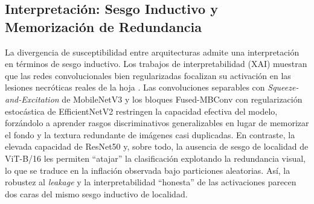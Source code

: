 \documentclass[journal,compsoc]{IEEEtran}
\begin{document}
\begin{table}[H]
\centering
\caption{Exactitud Reportada (particiones aleatorias) vs.\ Evaluación Anti-Fuga de Este Trabajo}
\label{tab:sota}
\end{table}

\subsection{Interpretación: Sesgo Inductivo y Memorización de Redundancia}
La divergencia de susceptibilidad entre arquitecturas admite una interpretación en términos de sesgo inductivo. Los trabajos de interpretabilidad (XAI) muestran que las redes convolucionales bien regularizadas focalizan su activación en las lesiones necróticas reales de la hoja \cite{potatoxai2024, ramesh2024explainable}. Las convoluciones separables con \textit{Squeeze-and-Excitation} de MobileNetV3 y los bloques Fused-MBConv con regularización estocástica de EfficientNetV2 restringen la capacidad efectiva del modelo, forzándolo a aprender rasgos discriminativos generalizables en lugar de memorizar el fondo y la textura redundante de imágenes casi duplicadas. En contraste, la elevada capacidad de ResNet50 y, sobre todo, la ausencia de sesgo de localidad de ViT-B/16 \cite{dosovitskiy2020image} les permiten ``atajar'' la clasificación explotando la redundancia visual, lo que se traduce en la inflación observada bajo particiones aleatorias. Así, la robustez al \textit{leakage} y la interpretabilidad ``honesta'' de las activaciones parecen dos caras del mismo sesgo inductivo de localidad.
\end{document}
